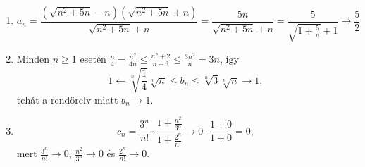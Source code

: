\documentclass[11pt]{scrartcl}
\begin{document}
\begin{enumerate}
	\item \[
		      a_n
		      = \frac{\left(\sqrt{n^2 + 5n} - n\right)\left(\sqrt{n^2 + 5n} + n\right)}{\sqrt{n^2 + 5n} + n}
		      = \frac{5n}{\sqrt{n^2 + 5n} + n}
		      = \frac{5}{\sqrt{1 + \frac{5}{n}} + 1}
		      \to \frac{5}{2}
	      \]

	\item Minden $n \ge 1$ esetén
	      \(
	      \frac{n}{4} = \frac{n^2}{4n} \le \frac{n^2 + 2}{n + 3} \le \frac{3n^2}{n} = 3n
	      \),
	      így
	      \[
		      1
		      \leftarrow \sqrt[n]{\frac{1}{4}} \sqrt[n]{n}
		      \le b_n
		      \le \sqrt[n]{3} \sqrt[n]{n}
		      \to 1,
	      \]
	      tehát a rendőrelv miatt $b_n \to 1$.

	\item \[
		      c_n
		      = \frac{3^n}{n!} \cdot
		      \frac{1 + \frac{n^2}{3^n}}{1 + \frac{2^n}{n!}}
		      \to 0 \cdot \frac{1 + 0}{1 + 0}
		      = 0,
	      \]
	      mert $\frac{3^n}{n!} \to 0$, $\frac{n^2}{3^n} \to 0$ és
	      $\frac{2^n}{n!} \to 0$.
\end{enumerate}
\end{document}
